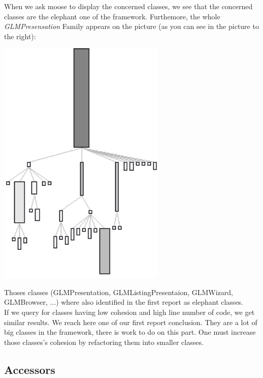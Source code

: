 \documentclass[11pt,a4paper]{article}
\begin{document}
\begin{minipage}[t]{0.4\textwidth}
When we ask moose to display the concerned classes, we see that the concerned classes are the elephant one of the framework. Furthemore, the whole \textit{GLMPresensation} Family appears on the picture (as you can see in the picture to the right):

\end{minipage}
\hfill
\begin{minipage}[t]{0.6\textwidth}
    \centering
     \vspace{-1.5ex}
\includegraphics[width=0.6\textwidth]{GLMPresentation_family}
\end{minipage} 


Thoses classes (GLMPresentation, GLMListingPresentaion, GLMWizard, GLMBrowser, ...)  where also identified in the first report as elephant  classes.\\

If we query for classes having low cohesion and high line number of code, we get similar results. We reach here one of our first report conclusion. They are a lot of big classes in the framework, there is work to do on this part. One must increase those classes's cohesion by refactoring them into smaller classes.\\
 
 
\subsection{Accessors} 
\end{document}
